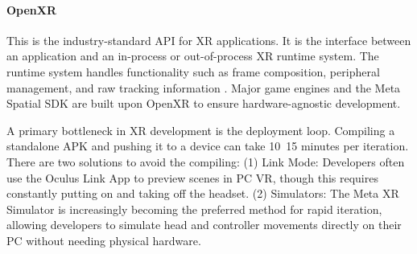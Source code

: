 
\paragraph{OpenXR}

This is the industry-standard API for XR applications. It is the interface between an application and an in-process or out-of-process XR runtime system. The runtime system handles functionality such as frame composition, peripheral management, and raw tracking information \parencite{openxr2024spec}. Major game engines and the Meta Spatial SDK are built upon OpenXR to ensure hardware-agnostic development. 

A primary bottleneck in XR development is the deployment loop. Compiling a standalone APK and pushing it to a device can take 10~15 minutes per iteration. There are two solutions to avoid the compiling: (1) Link Mode: Developers often use the Oculus Link App to preview scenes in PC VR, though this requires constantly putting on and taking off the headset. (2) Simulators: The Meta XR Simulator is increasingly becoming the preferred method for rapid iteration, allowing developers to simulate head and controller movements directly on their PC without needing physical hardware.